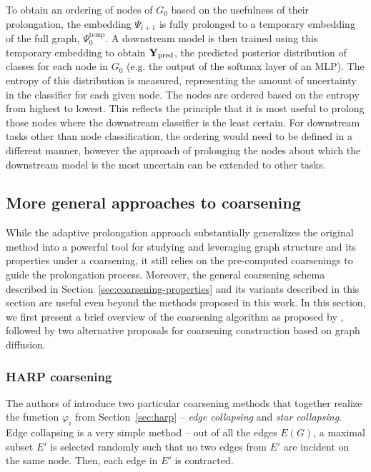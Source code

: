 \documentclass[sn-mathphys,pdflatex,iicol]{sn-jnl}%
\newcommand{\name}[1]{\textit{#1}}
\newcommand{\mathmat}{\ensuremath{\mathbf}}
\begin{document}
To obtain an ordering of nodes of \( G_0 \) based on the usefulness of their prolongation, the embedding \( \Psi_{i + 1} \) is fully prolonged to a temporary embedding of the full graph, \( \Psi_0^\mathrm{temp} \). A downstream model is then trained using this temporary embedding to obtain \( \mathmat{Y}_\mathrm{pred} \), the predicted posterior distribution of classes for each node in \( G_0 \) (e.g. the output of the softmax layer of an MLP). The entropy of this distribution is measured, representing the amount of uncertainty in the classifier for each given node. The nodes are ordered based on the entropy from highest to lowest. This reflects the principle that it is most useful to prolong those nodes where the downstream classifier is the least certain. For downstream tasks other than node classification, the ordering would need to be defined in a different manner, however the approach of prolonging the nodes about which the downstream model is the most uncertain can be extended to other tasks.

\subsection{More general approaches to coarsening}\label{sec:coarsening-algorithms}

While the adaptive prolongation approach substantially generalizes the original method into a powerful tool for studying and leveraging graph structure and its properties under a coarsening, it still relies on the pre-computed coarsenings to guide the prolongation process. Moreover, the general coarsening schema described in Section~\ref{sec:coarsening-properties} and its variants described in this section are useful even beyond the methods proposed in this work. In this section, we first present a brief overview of the coarsening algorithm as proposed by \cite{chen_harp_2018}, followed by two alternative proposals for coarsening construction based on graph diffusion.

\subsubsection{HARP coarsening}\label{sec:harp-coarsening}

The authors of \cite{chen_harp_2018} introduce two particular coarsening methods that together realize the function \( \varphi_i \) from Section~\ref{sec:harp} -- \name{edge collapsing} and \name{star collapsing}. Edge collapsing is a very simple method -- out of all the edges \( E \left( G \right) \), a maximal subset \( E' \) is selected randomly such that no two edges from \( E' \) are incident on the same node. Then, each edge in \( E' \) is contracted.
\end{document}
